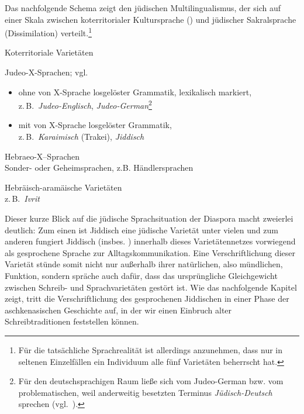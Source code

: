 Das nachfolgende Schema zeigt den jüdischen Multilingualismus, der sich auf einer Skala zwischen koterritorialer Kultursprache () und jüdischer Sakralsprache (Dissimilation) verteilt.\footnote{Für die tatsächliche Sprachrealität ist allerdings anzunehmen, dass nur in seltenen Einzelfällen ein Individuum alle fünf Varietäten beherrscht hat.} %


 
 \begin{description}\label{schämamultilingualismus}
  
  \item [\isi{Assimilation}/X-Sprachen]
  
  \item [A] Koterritoriale Varietäten

  \item [B] Judeo-X-Sprachen; vgl.\, \citet[193]{Sephiha1985}
  
\begin{itemize}
\item [\hai{Typ 1}] ohne von X-Sprache losgelöster Grammatik, lexikalisch markiert,\\ z.\,B.\, \textit{Judeo-Englisch}, \textit{Judeo-German}\footnote{Für den deutschsprachigen Raum ließe sich vom Judeo-German bzw. vom problematischen, weil anderweitig besetzten Terminus \textit{Jüdisch-Deutsch} sprechen (vgl.\, \citealt{FleischerimErsch}).} %
\item [\hai{Typ 2}] mit von X-Sprache losgelöster Grammatik,\\ z.\,B.\, \textit{Karaimisch} (Trakei), \textit{\alert{Jiddisch}}

\end{itemize}  
 
\item [C] Hebraeo-X–Sprachen\\
 Sonder- oder Geheimsprachen,
 z.B. Händlersprachen

\item [D] Hebräisch-aramäische Varietäten\\
z.\,B.\, \textit{Ivrit}

\item[Dissimilation/Sakralsprache]

  \end{description}%


Dieser kurze Blick auf die jüdische Sprachsituation der Diaspora macht zweierlei deutlich: Zum einen ist Jiddisch eine jüdische Varietät unter vielen und zum anderen fungiert Jiddisch (insbes. ) innerhalb dieses Varietätennetzes vorwiegend als gesprochene Sprache zur Alltagskommunikation. Eine Verschriftlichung dieser Varietät stünde somit nicht nur außerhalb ihrer natürlichen, also mündlichen, Funktion, sondern spräche auch dafür, dass das ursprüngliche Gleichgewicht zwischen Schreib- und Sprachvarietäten gestört ist. Wie das nachfolgende Kapitel zeigt, tritt die Verschriftlichung des gesprochenen Jiddischen in einer Phase der aschkenasischen Geschichte auf, in der wir einen Einbruch alter Schreibtraditionen feststellen können.
 
